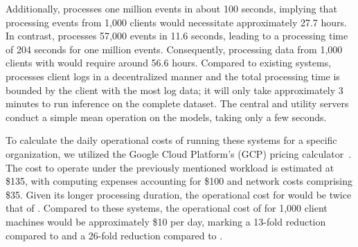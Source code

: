  Additionally, \flash processes one million events in about 100 seconds, implying that processing events from 1,000 clients would necessitate approximately 27.7 hours. In contrast, \kairos processes 57,000 events in 11.6 seconds, leading to a processing time of 204 seconds for one million events. Consequently, processing data from 1,000 clients with \kairos would require around 56.6 hours. Compared to existing systems, \Sys processes client logs in a decentralized manner and the total processing time is bounded by the client with the most log data; it will only take approximately 3 minutes to run inference on the complete \optc dataset. The central and utility servers conduct a simple mean operation on the models, taking only a few seconds.

 To calculate the daily operational costs of running these systems for a specific organization, we utilized the Google Cloud Platform's (GCP) pricing calculator~\cite{gcp}. The cost to operate \flash under the previously mentioned workload is estimated at \$135, with computing expenses accounting for \$100 and network costs comprising \$35. Given its longer processing duration, the operational cost for \kairos would be twice that of \flash. Compared to these systems, the operational cost of \Sys for 1,000 client machines would be approximately \$10 per day, marking a 13-fold reduction compared to \flash and a 26-fold reduction compared to \kairos.



